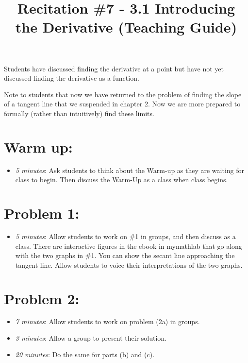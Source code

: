 \documentclass[handout,nooutcomes]{ximera}
\title{Recitation \#7 - 3.1 Introducing the Derivative (Teaching Guide)}
\begin{document}
\begin{abstract}		\end{abstract}
\maketitle

Students have discussed finding the derivative at a point but have not yet discussed finding the derivative as a function.

Note to students that now we have returned to the problem of finding the slope of a tangent line that we suspended in chapter 2. Now we are more prepared to formally (rather than intuitively) find these limits.

\section*{Warm up:} 
	
	\begin{itemize}
	
	\item  \emph{5 minutes}:  Ask students to think about the Warm-up as they are waiting for class to begin.  Then discuss the Warm-Up as a class when class begins. 	
	\end{itemize}


\section*{Problem 1:}

	\begin{itemize}
	
	\item  \emph{5 minutes}:  Allow students to work on \#1 in groups, and then discuss as a class.  There are interactive figures in the ebook in mymathlab that go along with the two graphs in \#1.  You can show the secant line approaching the tangent line.  Allow students to voice their interpretations of the two graphs.
			
	\end{itemize}
	
	
	
\section*{Problem 2:}

	\begin{itemize}
	
	\item  \emph{7 minutes}:  Allow students to work on problem (2a) in groups. 
	
	\item \emph{3 minutes}:   Allow a group to present their solution.
	
	\item \emph{20 minutes}:  Do the same for parts (b) and (c).	
	
	\end{itemize}
	
\end{document}
